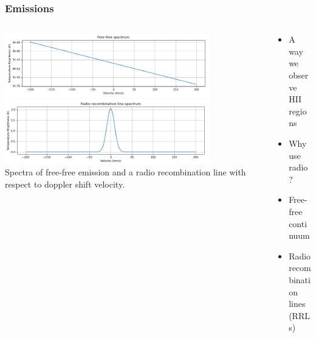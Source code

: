 \documentclass[aspectratio=169,compress]{beamer}
\newcommand\teeny{\fontsize{3pt}{3.6pt}\selectfont}
\begin{document}
\begin{frame}
  \frametitle{Emissions}
  \begin{columns}
    \begin{column}{0.5\textwidth}
      \includegraphics[width=0.8\textwidth]{figures/ffspectrum.png}
      \includegraphics[width=0.8\textwidth]{figures/rrlspectrum.png}
      {\teeny\\ Spectra of free-free emission and a radio recombination line with respect to doppler shift velocity.}
    \end{column}
    \begin{column}{0.5\textwidth}
      \begin{itemize}
        \item A way we observe HII regions
        \item Why use radio?
        \item Free-free continuum
        \item Radio recombination lines (RRLs)
      \end{itemize}
    \end{column}
  \end{columns}
\end{frame}
\end{document}

